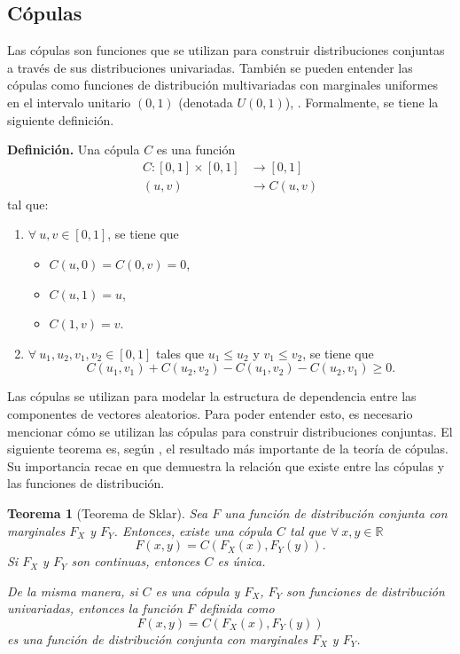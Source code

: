 \documentclass[11pt,a4paper]{article}
\newcommand{\R}{\mathbb{R}}
\newtheorem{theorem}{Teorema}[section]
\begin{document}
\label{cap:cop}
\subsection{Cópulas} \label{sec_copulas}

Las cópulas son funciones que se utilizan para construir distribuciones conjuntas a través de sus distribuciones univariadas. También se pueden entender las cópulas como funciones de distribución multivariadas con marginales uniformes en el intervalo unitario $(0,1)$ (denotada $U(0, 1)$), \citep{nelsen}. Formalmente, se tiene la siguiente definición.

\textbf{Definición.} Una cópula $C$ es una función 
\begin{align*}
C: [0,1]\times[0,1]&\to [0,1]\\
(u,v) &\to C(u,v)
\end{align*} tal que:
\begin{enumerate}
\item $\forall \ u,v \in [0,1]$, se tiene que
\begin{itemize}
\item $C (u,0) = C(0,v) = 0$,
\item $C(u,1) = u$,
\item $C(1, v) = v$.
\end{itemize}
\item $\forall \ u_1, u_2, v_1, v_2 \in [0,1]$ tales que $u_1 \leq u_2$ y $v_1 \leq v_2$, se tiene que  $$C (u_1,v_1)+C (u_2,v_2) - C(u_1,v_2) - C(u_2,v_1)\geq 0.$$
\end{enumerate}

Las cópulas se utilizan para modelar la estructura de dependencia entre las componentes de vectores aleatorios. Para poder entender esto, es necesario mencionar cómo se utilizan las cópulas para construir distribuciones conjuntas. El siguiente teorema es, según \citet{copula_modeling}, el resultado más importante de la teoría de cópulas. Su importancia recae en que demuestra la relación que existe entre las cópulas y las funciones de distribución.

\begin{theorem}[Teorema de Sklar]
\label{sklar}
Sea $F$ una función de distribución conjunta con marginales $F_X$ y $F_Y$. Entonces, existe una cópula $C$ tal que $\forall \ x,y \in \R$ $$F(x,y) = C(F_X(x), F_Y(y)).$$ Si $F_X$ y $F_Y$ son continuas, entonces $C$ es única.

De la misma manera, si $C$ es una cópula y $F_X$, $F_Y$ son funciones de distribución univariadas, entonces la función $F$ definida como $$F(x, y) = C(F_X(x), F_Y(y))$$ es una función de distribución conjunta con marginales $F_X$ y $F_Y$.
\end{theorem}
\end{document}
